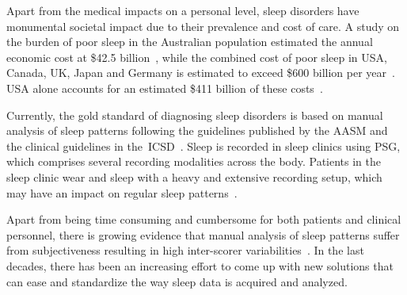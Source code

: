 Apart from the medical impacts on a personal level, sleep disorders have monumental societal impact due to their prevalence and cost of care.
A study on the burden of poor sleep in the Australian population estimated the annual economic cost at \$42.5 billion~\cite{Hillman2006}, while the combined cost of poor sleep in USA, Canada, UK, Japan and Germany is estimated to exceed \$600 billion per year~\cite{Hafner2017}. 
USA alone accounts for an estimated \$411 billion of these costs~\cite{Kiley2019}.

Currently, the gold standard of diagnosing sleep disorders is based on manual analysis of sleep patterns following the guidelines published by the \ac{AASM} and the clinical guidelines in the~\ac{ICSD}~\cite{AmericanAcademyofSleepMedicine2014}.
Sleep is recorded in sleep clinics using \ac{PSG}, which comprises several recording modalities across the body.
Patients in the sleep clinic wear and sleep with a heavy and extensive recording setup, which may have an impact on regular sleep patterns~\cite{Agnew1966, Scholle2003}.

Apart from being time consuming and cumbersome for both patients and clinical personnel, there is growing evidence that manual analysis of sleep patterns suffer from subjectiveness resulting in high inter-scorer variabilities~\cite{Drinnan1998, Whitney1998, Danker-Hopfe2004, Norman2000, Magalang2013, Rosenberg2013, Rosenberg2014, Younes2016, Younes2018}.
In the last decades, there has been an increasing effort to come up with new solutions that can ease and standardize the way sleep data is acquired and analyzed. 


